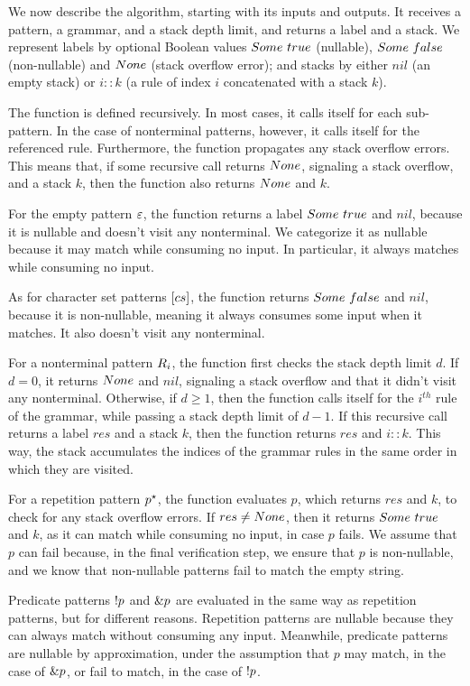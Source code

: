 We now describe the algorithm,
starting with its inputs and outputs.
It receives a pattern, a grammar, and a stack depth limit,
and returns a label and a stack.
We represent labels by
optional Boolean values
$Some\ true$ (nullable),
$Some\ false$ (non-nullable) and
$None$ (stack overflow error);
and stacks by either
$nil$ (an empty stack) or
$i :: k$ (a rule of index $i$ concatenated with a stack $k$).

The function is defined recursively.
In most cases, it calls itself for each sub-pattern.
In the case of nonterminal patterns, however,
it calls itself for the referenced rule.
Furthermore, the function propagates any stack overflow errors.
This means that,
if some recursive call returns $None$,
signaling a stack overflow,
and a stack $k$,
then the function also returns $None$ and $k$.

For the empty pattern $\varepsilon$,
the function returns a label $Some\ true$ and $nil$,
because it is nullable and doesn't visit any nonterminal.
We categorize it as nullable because it may match while consuming no input.
In particular, it always matches while consuming no input.

As for character set patterns $[cs]$,
the function returns $Some\ false$ and $nil$,
because it is non-nullable,
meaning it always consumes some input when it matches.
It also doesn't visit any nonterminal.

For a nonterminal pattern $R_{i}$,
the function first checks the stack depth limit $d$.
If $d=0$, it returns $None$ and $nil$,
signaling a stack overflow
and that it didn't visit any nonterminal.
Otherwise, if $d\ge1$,
then the function calls itself for the $i^{th}$ rule of the grammar,
while passing a stack depth limit of $d-1$.
If this recursive call returns a label $res$ and a stack $k$,
then the function returns $res$ and $i :: k$.
This way, the stack accumulates
the indices of the grammar rules
in the same order in which they are visited.

For a repetition pattern $p^\star$,
the function evaluates $p$,
which returns $res$ and $k$,
to check for any stack overflow errors.
If $res\ne None$,
then it returns $Some\ true$ and $k$,
as it can match while consuming no input,
in case $p$ fails.
We assume that $p$ can fail because,
in the final verification step,
we ensure that $p$ is non-nullable,
and we know that non-nullable patterns
fail to match the empty string.

Predicate patterns $!p$ and $\&p$ are evaluated
in the same way as repetition patterns,
but for different reasons.
Repetition patterns are nullable
because they can always match without consuming any input.
Meanwhile, predicate patterns are nullable by approximation,
under the assumption that $p$ may match,
in the case of $\&p$,
or fail to match,
in the case of $!p$.

